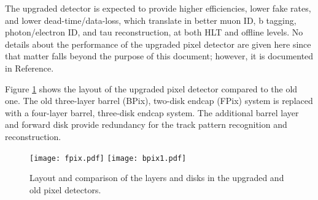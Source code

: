 
The upgraded detector is expected to provide higher efficiencies, lower fake rates, and lower dead-time/data-loss, which translate in better muon ID, b tagging, photon/electron ID, and tau reconstruction, at both HLT and offline levels. No details about the performance of the upgraded pixel detector are given here since that matter falls beyond the purpose of this document; however, it is documented in Reference\cite{pixel_performance}.

Figure \ref{fig:new_pix} shows the layout of the upgraded pixel detector compared to the old one. The old three-layer barrel (BPix), two-disk endcap (FPix) system is replaced with a four-layer barrel, three-disk endcap system. The additional barrel layer and forward disk provide redundancy for the track pattern recognition and reconstruction.

\begin{figure}[!h]
\centering
\texttt{[image: fpix.pdf]}
\texttt{[image: bpix1.pdf]}
\caption[Layout of the upgraded and old pixel detectors.]{Layout and comparison of the layers and disks in the upgraded and old pixel detectors.}\label{fig:new_pix}
\end{figure}

